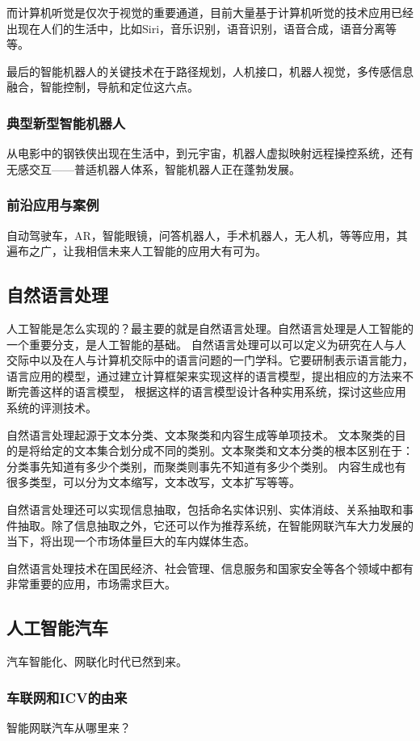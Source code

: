 \documentclass[12pt,a4paper,oneside]{article}
\begin{document}
而计算机听觉是仅次于视觉的重要通道，目前大量基于计算机听觉的技术应用已经出现在人们的生活中，比如Siri，音乐识别，语音识别，语音合成，语音分离等等。

最后的智能机器人的关键技术在于路径规划，人机接口，机器人视觉，多传感信息融合，智能控制，导航和定位这六点。
\subsubsection{典型新型智能机器人}
从电影中的钢铁侠出现在生活中，到元宇宙，机器人虚拟映射远程操控系统，还有无感交互——普适机器人体系，智能机器人正在蓬勃发展。
\subsubsection{前沿应用与案例}
自动驾驶车，AR，智能眼镜，问答机器人，手术机器人，无人机，等等应用，其遍布之广，让我相信未来人工智能的应用大有可为。
\subsection{自然语言处理}
人工智能是怎么实现的？最主要的就是自然语言处理。自然语言处理是人工智能的一个重要分支，是人工智能的基础。
自然语言处理可以可以定义为研究在人与人交际中以及在人与计算机交际中的语言问题的一门学科。它要研制表示语言能力，语言应用的模型，通过建立计算框架来实现这样的语言模型，提出相应的方法来不断完善这样的语言模型，
根据这样的语言模型设计各种实用系统，探讨这些应用系统的评测技术。

自然语言处理起源于文本分类、文本聚类和内容生成等单项技术。
文本聚类的目的是将给定的文本集合划分成不同的类别。文本聚类和文本分类的根本区别在于：分类事先知道有多少个类别，而聚类则事先不知道有多少个类别。
内容生成也有很多类型，可以分为文本缩写，文本改写，文本扩写等等。

自然语言处理还可以实现信息抽取，包括命名实体识别、实体消歧、关系抽取和事件抽取。除了信息抽取之外，它还可以作为推荐系统，在智能网联汽车大力发展的当下，将出现一个市场体量巨大的车内媒体生态。

自然语言处理技术在国民经济、社会管理、信息服务和国家安全等各个领域中都有非常重要的应用，市场需求巨大。

\subsection{人工智能汽车}
汽车智能化、网联化时代已然到来。
\subsubsection{车联网和ICV的由来}
智能网联汽车从哪里来？
\end{document}
